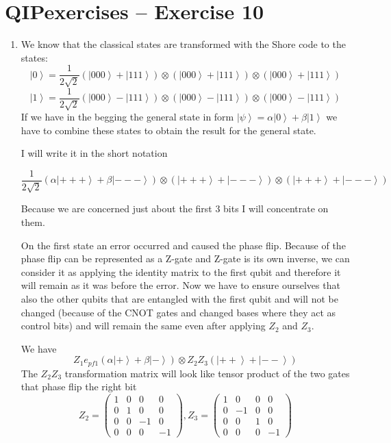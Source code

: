 \documentclass[a4paper,10pt]{article}
\newcommand{\ket}[1]{\ensuremath{\left|#1\right\rangle}} %
\newcommand{\aps}{\ensuremath{\frac{1}{2\sqrt{2}}}}
\begin{document}
\section*{QIPexercises -- Exercise 10}
\begin{enumerate}[1.]
\item We know that the classical states are transformed with the Shore code to the states:
$$
\ket{0} = \aps (\ket{000} + \ket{111}) \otimes (\ket{000} + \ket{111}) \otimes (\ket{000} + \ket{111})
$$
$$
\ket{1} = \aps (\ket{000} - \ket{111}) \otimes (\ket{000} - \ket{111}) \otimes (\ket{000} - \ket{111})
$$
If we have in the begging the general state in form $\ket{\psi} = \alpha\ket{0} + \beta\ket{1}$ we have to combine these states to obtain the result for the general state.

I will write it in the short notation

$$
\aps (\alpha\ket{+++} + \beta\ket{---}) \otimes (\ket{+++} + \ket{---}) \otimes (\ket{+++} + \ket{---})
$$

Because we are concerned just about the first 3 bits I will concentrate on them. 

On the first state an error occurred and caused the phase flip. Because of the phase flip can be represented as a Z-gate and Z-gate is its own inverse, we can consider it as applying the identity matrix to the first qubit and therefore it will remain as it was before the error. Now we have to ensure ourselves that also the other qubits that are entangled with the first qubit and will not be changed (because of the CNOT gates and changed bases where they act as control bits) and will remain the same even after applying $Z_2$ and $Z_3$.

We have $$
Z_1e_{pf1}(\alpha\ket{+}+ \beta\ket{-})\otimes Z_2Z_3(\ket{++} + \ket{--})
$$
The $Z_2Z_3$ transformation matrix will look like tensor product of the two gates that phase flip the right bit
$$
Z_2 = \left(
\begin{array}{cccc}
1& 0& 0& 0 \\
0& 1& 0 &0\\
0 &0& -1& 0\\
0 &0& 0 &-1
\end{array}
\right), 
Z_3 = \left(
\begin{array}{cccc}
1& 0& 0& 0 \\
0& -1& 0 &0\\
0 &0& 1& 0\\
0 &0& 0 &-1
\end{array}
\right)
$$


\end{enumerate}
\end{document}
